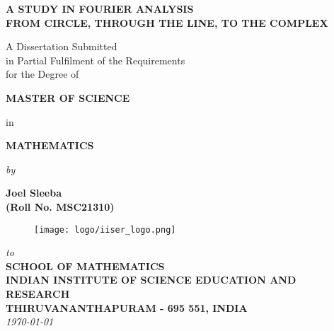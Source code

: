 \begin{titlepage}

\begin{center}

  \vfill

  \textbf{\Large A STUDY IN FOURIER ANALYSIS}\\[10pt]
  \textbf{FROM CIRCLE, THROUGH THE LINE, TO THE COMPLEX}\\[8pt]

  \vfill

  A Dissertation Submitted \\
  in Partial Fulfilment of the Requirements  \\
  for the Degree of  \\

  \vfill

  {\Large \bf MASTER OF SCIENCE }

  \vfill

  in

  \vfill

  {\large \bf MATHEMATICS }

  \vfill

  {\em  by} 

  \vfill

  {\large \bf Joel Sleeba} \\[0.3em] %
  {\large \bf (Roll No. MSC21310)}\\[2em]

  \vfill

  \begin{figure}[h]
    \begin{center}
      \texttt{[image: logo/iiser\_logo.png]}
    \end{center}
  \end{figure}

  \vfill

  {\em\large to }\\[1em]
  {\bf\large SCHOOL OF MATHEMATICS} \\%
  {\bf\large INDIAN INSTITUTE OF SCIENCE EDUCATION AND RESEARCH}\\%
  {\bf\large THIRUVANANTHAPURAM - 695 551, INDIA}\\[1em]
  {\it\large \today }

\end{center}
\end{titlepage}

\clearpage


